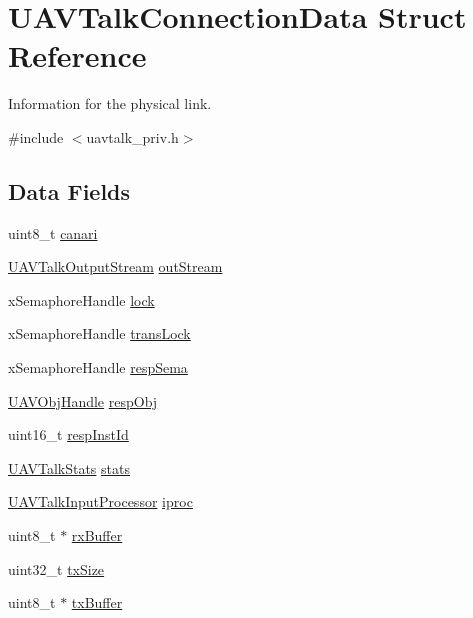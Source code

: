 \hypertarget{struct_u_a_v_talk_connection_data}{\section{\-U\-A\-V\-Talk\-Connection\-Data \-Struct \-Reference}
\label{struct_u_a_v_talk_connection_data}
}


\-Information for the physical link.  




{\ttfamily \#include $<$uavtalk\-\_\-priv.\-h$>$}

\subsection*{\-Data \-Fields}
\begin{DoxyCompactItemize}
\item 
uint8\-\_\-t \hyperlink{struct_u_a_v_talk_connection_data_a7fcfd5eef5b464048953ae8a62995142}{canari}
\item 
\hyperlink{group___u_a_v_talk_ga0c67fb4d23157d56fe1982e4788938c7}{\-U\-A\-V\-Talk\-Output\-Stream} \hyperlink{struct_u_a_v_talk_connection_data_a9fbab27aee45e892087f580683fcec5f}{out\-Stream}
\item 
x\-Semaphore\-Handle \hyperlink{struct_u_a_v_talk_connection_data_ad1614e80f39f9dfbe062a5cb7375387b}{lock}
\item 
x\-Semaphore\-Handle \hyperlink{struct_u_a_v_talk_connection_data_aba8ea97fea7c1cbd1bf09b5706cfffeb}{trans\-Lock}
\item 
x\-Semaphore\-Handle \hyperlink{struct_u_a_v_talk_connection_data_a8ae2519b555461363d46f9b27a80d051}{resp\-Sema}
\item 
\hyperlink{targets_2_u_a_v_objects_2inc_2uavobjectmanager_8h_a279053e22be53ce9f895043aaeb91e3b}{\-U\-A\-V\-Obj\-Handle} \hyperlink{struct_u_a_v_talk_connection_data_af0a71495a3337b87b43dcfdda5424ade}{resp\-Obj}
\item 
uint16\-\_\-t \hyperlink{struct_u_a_v_talk_connection_data_a88e0af1586f91007f920afeb962b759f}{resp\-Inst\-Id}
\item 
\hyperlink{struct_u_a_v_talk_stats}{\-U\-A\-V\-Talk\-Stats} \hyperlink{struct_u_a_v_talk_connection_data_ac81dea7c4ec7ecc0fb400374796e4caf}{stats}
\item 
\hyperlink{struct_u_a_v_talk_input_processor}{\-U\-A\-V\-Talk\-Input\-Processor} \hyperlink{struct_u_a_v_talk_connection_data_aa032a7b051df7fcc53accec1d7ba602b}{iproc}
\item 
uint8\-\_\-t $\ast$ \hyperlink{struct_u_a_v_talk_connection_data_a183fa5adb153369530ac1ff53c4f3f8f}{rx\-Buffer}
\item 
uint32\-\_\-t \hyperlink{struct_u_a_v_talk_connection_data_a1cac6d157b4dbf6d91882833c7ce304c}{tx\-Size}
\item 
uint8\-\_\-t $\ast$ \hyperlink{struct_u_a_v_talk_connection_data_a63bb147699417c91ed5176745eb46211}{tx\-Buffer}
\end{DoxyCompactItemize}


